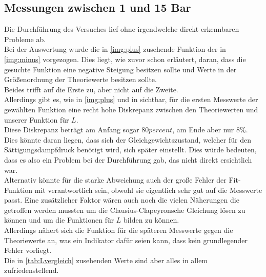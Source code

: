 \subsection{Messungen zwischen 1 und 15 Bar}

Die Durchführung des Versuches lief ohne irgendwelche direkt erkennbaren Probleme ab.\\
Bei der Auswertung wurde die in \ref{img:plus} zusehende Funktion der in \ref{img:minus} vorgezogen.
Dies liegt, wie zuvor schon erläutert, daran, dass die gesuchte Funktion eine negative Steigung besitzen sollte und Werte in der Größenordnung der Theoriewerte besitzen sollte.\\
Beides trifft auf die Erste zu, aber nicht auf die Zweite.\\
Allerdings gibt es, wie in \ref{img:plus} und in   sichtbar, für die ersten Messwerte der gewählten Funktion eine recht hohe Diskrepanz zwischen den Theoriewerten und unserer Funktion für $L$.\\
Diese Diskrepanz beträgt am Anfang sogar $80 \si{percent}$, am Ende aber nur $ 8\si{\percent}$.\\
Dies könnte daran liegen, dass sich der Gleichgewichtszustand, welcher für den Sättigungsdampfdruck benötigt wird, sich später einstellt.
Dies würde bedeuten, dass es also ein Problem bei der Durchführung gab, das nicht direkt ersichtlich war.\\
Alternativ könnte für die starke Abweichung auch der große Fehler der Fit-Funktion mit verantwortlich sein, obwohl sie eigentlich sehr gut auf 
die Messwerte passt. Eine zusätzlicher Faktor wären auch noch die vielen Näherungen die getroffen werden mussten um die Clausius-Clapeyronsche Gleichung lösen zu können
und um die Funktionen für $L$ bilden zu können.\\
Allerdings nähert sich die Funktion für die späteren Messwerte gegen die Theoriewerte an, was ein Indikator dafür seien kann, dass kein grundlegender Fehler vorliegt.\\
Die in \ref{tab:Lvergleich} zusehenden Werte sind aber alles in allem zufriedenstellend.

